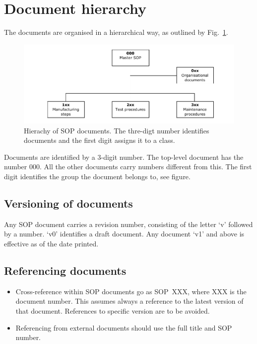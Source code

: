 \documentclass[12pt]{unlsilabsop}
\begin{document}
\section{Document hierarchy}
The documents are organised in a hierarchical way, as outlined by Fig.~\ref{fig:SOPhierarchy}.
\begin{figure}[h]
    \begin{center}
        \includegraphics[width=16cm]{img/SOPhierarchy.pdf}
        \caption{Hierachy of SOP documents. The thre-digt number identifies documents and the first digit assigns it to a class.}
        \label{fig:SOPhierarchy}
    \end{center}
\end{figure}
Documents are identified by a 3-digit number. The top-level document has the number 000. All the other documents carry numbers different from this. The first digit identifies the group the document belongs to, see figure.

\subsection{Versioning of documents}
Any SOP document carries a revision number, consisting of the letter `v' followed by a number. `v0' identifies a draft document. Any document `v1' and above is effective as of the date printed.

\subsection{Referencing documents}
\begin{itemize}
\item Cross-reference within SOP documents go as SOP~XXX, where XXX is the document number. This assumes always a reference to the latest version of that document. References to specific version are to be avoided.
\item Referencing from external documents should use the full title and SOP number.
\end{itemize}
\end{document}
